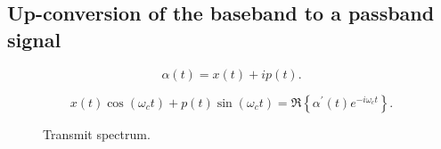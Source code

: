 \subsection{Up-conversion of the baseband to a passband signal}

\begin{equation}
	\alpha(t)
	=
	x(t)
	+
	ip(t)
	.
\end{equation}

\begin{equation}
	x(t)
	\cos(\omega_ct)
	+
	p(t)
	\sin(\omega_ct)
	=
	\Re\left\{
		\alpha^\prime(t)
		e^{-i\omega_ct}
	\right\}
	\label{eq:passband_signal}.
\end{equation}

\begin{figure}[htb]
	\centering
	\caption{Transmit spectrum.}\label{fig:transmit_spectrum}
\end{figure}